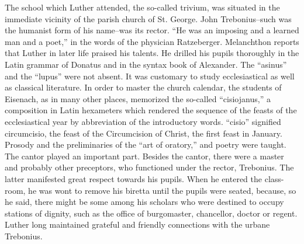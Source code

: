The school which Luther attended, the so-called trivium, was
situated in the immediate vicinity of the parish church of St. George.
John Trebonius--such was the humanist form of his name--was its
rector. “He was an imposing and a learned man and a poet,” in the
words of the physician Ratzeberger. Melanchthon reports that Luther
in later life praised his talents. He drilled his pupils thoroughly in
the Latin grammar of Donatus and in the syntax book of Alexander.
The “asinus” and the “lupus” were not absent. It was customary to
study ecclesiastical as well as classical literature. In order to master
the church calendar, the students of Eisenach, as in many other places,
memorized the so-called “cisiojanus,” a composition in Latin hexameters which rendered the sequence of the feasts of the ecclesiastical
year by abbreviation of the introductory words. “cisio” signified circumcisio, the feast of the Circumcision of Christ, the first feast
in January. Prosody and the preliminaries of the “art of oratory,” and
poetry were taught. The cantor played an important part. Besides
the cantor, there were a master and probably other preceptors, who
functioned under the rector, Trebonius. The latter manifested great
respect towards his pupils. When he entered the class-room, he was
wont to remove his biretta until the pupils were seated, because, so he
said, there might be some among his scholars who were destined to
occupy stations of dignity, such as the office of burgomaster, chancellor, doctor or regent. Luther long maintained grateful and friendly
connections with the urbane Trebonius.

